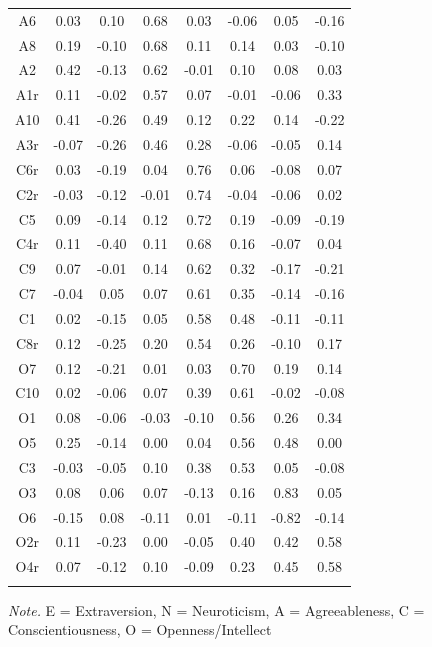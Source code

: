 \documentclass[
  english,
  man, fleqn, noextraspace]{apa6}
\begin{document}
\begin{table}[tbp]
\begin{center}
\begin{threeparttable}
{\begin{tabular}{cccccccc}
A6 & 0.03 & 0.10 & 0.68 & 0.03 & -0.06 & 0.05 & -0.16\\
A8 & 0.19 & -0.10 & 0.68 & 0.11 & 0.14 & 0.03 & -0.10\\
A2 & 0.42 & -0.13 & 0.62 & -0.01 & 0.10 & 0.08 & 0.03\\
A1r & 0.11 & -0.02 & 0.57 & 0.07 & -0.01 & -0.06 & 0.33\\
A10 & 0.41 & -0.26 & 0.49 & 0.12 & 0.22 & 0.14 & -0.22\\
A3r & -0.07 & -0.26 & 0.46 & 0.28 & -0.06 & -0.05 & 0.14\\
C6r & 0.03 & -0.19 & 0.04 & 0.76 & 0.06 & -0.08 & 0.07\\
C2r & -0.03 & -0.12 & -0.01 & 0.74 & -0.04 & -0.06 & 0.02\\
C5 & 0.09 & -0.14 & 0.12 & 0.72 & 0.19 & -0.09 & -0.19\\
C4r & 0.11 & -0.40 & 0.11 & 0.68 & 0.16 & -0.07 & 0.04\\
C9 & 0.07 & -0.01 & 0.14 & 0.62 & 0.32 & -0.17 & -0.21\\
C7 & -0.04 & 0.05 & 0.07 & 0.61 & 0.35 & -0.14 & -0.16\\
C1 & 0.02 & -0.15 & 0.05 & 0.58 & 0.48 & -0.11 & -0.11\\
C8r & 0.12 & -0.25 & 0.20 & 0.54 & 0.26 & -0.10 & 0.17\\
O7 & 0.12 & -0.21 & 0.01 & 0.03 & 0.70 & 0.19 & 0.14\\
C10 & 0.02 & -0.06 & 0.07 & 0.39 & 0.61 & -0.02 & -0.08\\
O1 & 0.08 & -0.06 & -0.03 & -0.10 & 0.56 & 0.26 & 0.34\\
O5 & 0.25 & -0.14 & 0.00 & 0.04 & 0.56 & 0.48 & 0.00\\
C3 & -0.03 & -0.05 & 0.10 & 0.38 & 0.53 & 0.05 & -0.08\\
O3 & 0.08 & 0.06 & 0.07 & -0.13 & 0.16 & 0.83 & 0.05\\
O6 & -0.15 & 0.08 & -0.11 & 0.01 & -0.11 & -0.82 & -0.14\\
O2r & 0.11 & -0.23 & 0.00 & -0.05 & 0.40 & 0.42 & 0.58\\
O4r & 0.07 & -0.12 & 0.10 & -0.09 & 0.23 & 0.45 & 0.58\\
\bottomrule
\addlinespace
\end{tabular}

}

\begin{tablenotes}[para]
\normalsize{\textit{Note.} E = Extraversion, N = Neuroticism, A = Agreeableness, C = Conscientiousness, O = Openness/Intellect}
\end{tablenotes}

\end{threeparttable}
\end{center}

\end{table}
\end{document}
